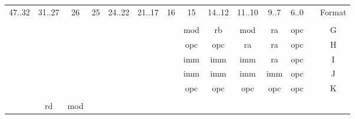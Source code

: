 \begin{table}[hbt!]
\centering
\begin{tabular}{cccccccccccccc}
\cline{1-12} \cline{14-14}
\multicolumn{1}{|c|}{47..32} &
  \multicolumn{1}{c|}{31..27} &
  \multicolumn{1}{c|}{26} &
  \multicolumn{1}{c|}{25} &
  \multicolumn{1}{c|}{24..22} &
  \multicolumn{1}{c|}{21..17} &
  \multicolumn{1}{c|}{16} &
  \multicolumn{1}{c|}{15} &
  \multicolumn{1}{c|}{14..12} &
  \multicolumn{1}{c|}{11..10} &
  \multicolumn{1}{c|}{9..7} &
  \multicolumn{1}{c|}{6..0} &
  \multicolumn{1}{c|}{} &
  \multicolumn{1}{c|}{Format} \\ \cline{1-12} \cline{14-14} 
 &
   &
   &
   &
   &
   &
   &
   &
   &
   &
   &
   &
   &
   \\ \cline{8-12} \cline{14-14} 
 &
   &
   &
   &
   &
   &
  \multicolumn{1}{c|}{} &
  \multicolumn{1}{c|}{mod} &
  \multicolumn{1}{c|}{rb} &
  \multicolumn{1}{c|}{mod} &
  \multicolumn{1}{c|}{ra} &
  \multicolumn{1}{c|}{opc} &
  \multicolumn{1}{c|}{} &
  \multicolumn{1}{c|}{G} \\ \cline{8-12} \cline{14-14} 
 &
   &
   &
   &
   &
   &
  \multicolumn{1}{c|}{} &
  \multicolumn{1}{c|}{opc} &
  \multicolumn{1}{c|}{opc} &
  \multicolumn{1}{c|}{ra} &
  \multicolumn{1}{c|}{ra} &
  \multicolumn{1}{c|}{opc} &
  \multicolumn{1}{c|}{} &
  \multicolumn{1}{c|}{H} \\ \cline{8-12} \cline{14-14} 
 &
   &
   &
   &
   &
   &
  \multicolumn{1}{c|}{} &
  \multicolumn{1}{c|}{imm} &
  \multicolumn{1}{c|}{imm} &
  \multicolumn{1}{c|}{imm} &
  \multicolumn{1}{c|}{ra} &
  \multicolumn{1}{c|}{opc} &
  \multicolumn{1}{c|}{} &
  \multicolumn{1}{c|}{I} \\ \cline{8-12} \cline{14-14} 
 &
   &
   &
   &
   &
   &
  \multicolumn{1}{c|}{} &
  \multicolumn{1}{c|}{imm} &
  \multicolumn{1}{c|}{imm} &
  \multicolumn{1}{c|}{imm} &
  \multicolumn{1}{c|}{imm} &
  \multicolumn{1}{c|}{opc} &
  \multicolumn{1}{c|}{} &
  \multicolumn{1}{c|}{J} \\ \cline{8-12} \cline{14-14} 
 &
   &
   &
   &
   &
   &
  \multicolumn{1}{c|}{} &
  \multicolumn{1}{c|}{opc} &
  \multicolumn{1}{c|}{opc} &
  \multicolumn{1}{c|}{opc} &
  \multicolumn{1}{c|}{opc} &
  \multicolumn{1}{c|}{opc} &
  \multicolumn{1}{c|}{} &
  \multicolumn{1}{c|}{K} \\ \cline{8-12} \cline{14-14} 
 &
   &
   &
   &
   &
   &
   &
   &
   &
   &
   &
   &
   &
   \\ \cline{2-12} \cline{14-14} 
\multicolumn{1}{c|}{} &
  \multicolumn{1}{c|}{rd} &
  \multicolumn{1}{c|}{mod} &

\end{tabular}
\end{table}
